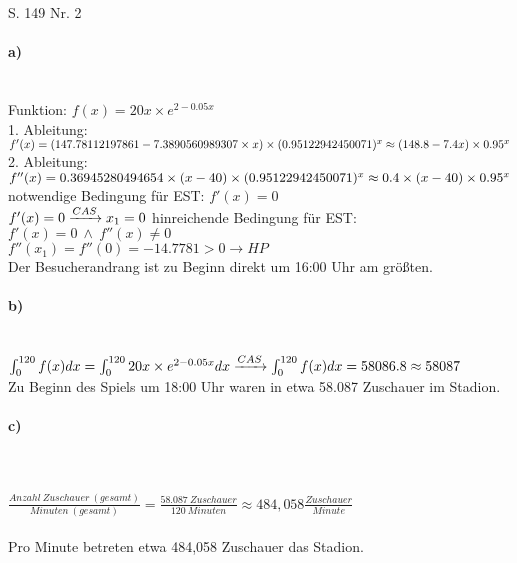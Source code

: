 \documentclass[a4paper, 12pt]{report}
\begin{document}
	\noindent
	\LARGE
	S. 149 Nr. 2
	\normalsize
	\paragraph{a)} \mbox{} \\
	Funktion: $f(x) = 20x \times e^{2-0.05x}$ \\
	1. Ableitung: $f'(x) = (147.78112197861-7.3890560989307 \times x) \times  (0.95122942450071)^x \\
	\approx (148.8-7.4x) \times 0.95^x
	$
	\\
	2. Ableitung: $f''(x) = 0.36945280494654\times (x-40)\times (0.95122942450071)^x \\
	\approx 0.4 \times (x - 40) \times 0.95^x $
	\\
	notwendige Bedingung für EST: $f'(x) = 0$ \\
	$
	f'(x) = 0 \\
	\xrightarrow{CAS} x_1 = 0 \\
	$
	hinreichende Bedingung für EST: $f'(x) = 0\ \land\ f''(x) \ne 0$
	\\
	$
	f''(x_1) = f''(0) = -14.7781 > 0 \to HP
	$
	\\[0.25cm]
	Der Besucherandrang ist zu Beginn direkt um 16:00 Uhr am größten.
	\\[0.5cm]
	
	\paragraph{b)} \mbox{} \\
	$
	\int_{0}^{120}f(x)dx = \int_{0}^{120}20x \times e^{2-0.05x} dx \\
	\xrightarrow{CAS} \int_{0}^{120} f(x) dx = 58086.8 \approx 58087
	$ \\
	Zu Beginn des Spiels um 18:00 Uhr waren in etwa 58.087 Zuschauer im Stadion.
	\\[0.5cm]
	
	\paragraph{c)} \mbox{} \\\\
	$
	\frac{Anzahl\ Zuschauer\ (gesamt)}{Minuten\ (gesamt)} = \frac{58.087\ Zuschauer}{120\ Minuten} \approx 484,058 \frac{Zuschauer}{Minute} 
	$\\\\
	Pro Minute betreten etwa 484,058 Zuschauer das Stadion.
	
\end{document}
